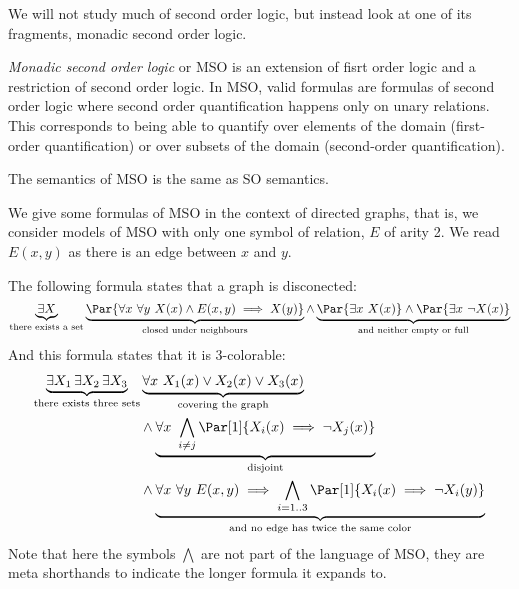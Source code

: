 We will not study much of second order logic, but instead
look at one of its fragments, monadic second order logic.

\begin{definition}
\emph{Monadic second order logic} or MSO is an extension of
fisrt order logic and a restriction of second order logic.
In MSO, valid formulas are formulas of second order logic
where second order quantification happens only on unary relations.
This corresponds to being able to quantify over elements
of the domain (first-order quantification)
or over subsets of the domain (second-order quantification).

The semantics of MSO is the same as SO semantics.
\end{definition}

\begin{examples}
    We give some formulas of MSO in the context of directed graphs,
    that is, we consider models of MSO with only one
    symbol of relation, $E$ of arity 2. We read $E(x, y)$
    as there is an edge between $x$ and $y$.

    The following formula states that a graph is disconected:
    \[
        \underbrace{
            \exists X
        }_{\text{there exists a set}}
        \underbrace{
            \Par{
                \forall x~
                \forall y~
                X(x) \wedge E(x, y)
                \implies X(y)
            }
        }_{\text{closed under neighbours}}
        \wedge
        \underbrace{
            \Par{
                \exists x~ X(x)
            }
            \wedge
            \Par{
                \exists x~ \neg X(x)
            }
        }_{\text{and neither empty or full}}
    \]
    And this formula states that it is 3-colorable:
    \begin{align*}
        \underbrace{
            \exists X_1\, \exists X_2\, \exists X_3
        }_{\text{there exists three sets}}
        & \underbrace{
                \forall x~
                X_1(x) \vee X_2(x) \vee X_3(x)
        }_{\text{covering the graph}}
        \\& \wedge \underbrace{
            \forall x~
            \bigwedge_{i \neq j} \Par[1]{
                X_i(x) \implies \neg X_j(x)
            }
        }_{\text{disjoint}}
        \\& \wedge \underbrace{
            \forall x~
            \forall y~
            E(x, y) \implies
            \bigwedge_{i = 1..3} \Par[1]{
                X_i(x) \implies \neg X_i(y)
            }
        }_{\text{and no edge has twice the same color}}
    \end{align*}
    Note that here the symbols $\bigwedge$ are not part of the language of MSO,
    they are meta shorthands to indicate the longer formula it expands to.
\end{examples}

